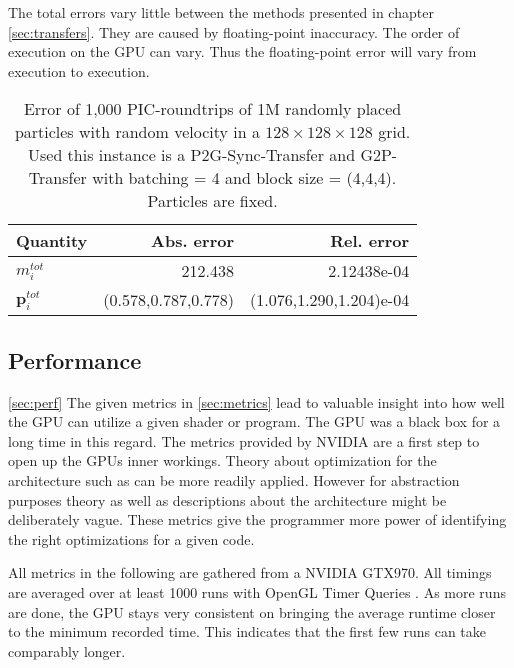 \documentclass[m,times]{cgMA}
\begin{document}
The total errors vary little between the methods presented in chapter \ref{sec:transfers}. They are caused by floating-point inaccuracy. The order of execution on the GPU can vary. Thus the floating-point error will vary from execution to execution.
\begin{table}[t]
\centering
  \begin{tabular}{|l|r|r|}\hline
    Quantity& Abs. error  & Rel. error \\ \hline
    $m^{tot}_i$ & 212.438     & 2.12438e-04     \\\hline
    $\boldsymbol{p}^{tot}_i$ & (0.578,0.787,0.778)&(1.076,1.290,1.204)e-04 \\\hline
   \end{tabular}
   \caption{Error of 1,000 PIC-roundtrips of 1M randomly placed particles with random velocity in a $128\times128\times128$ grid. Used this instance is a P2G-Sync-Transfer and G2P-Transfer with batching = 4 and block size = (4,4,4). Particles are fixed.}
  \label{tab:roundtrip}
\end{table}

\subsection{Performance}\ref{sec:perf}
The given metrics in \ref{sec:metrics} lead to valuable insight into how well the GPU can utilize a given shader or program. The GPU was a black box for a long time in this regard. The metrics provided by NVIDIA are a first step to open up the GPUs inner workings. Theory about optimization for the architecture such as \cite{NVIDIA:BEST:PRACTICE} can be more readily applied. However for abstraction purposes theory as well as descriptions about the architecture might be deliberately vague. These metrics give the programmer more power of identifying the right optimizations for a given code.

All metrics in the following are gathered from a NVIDIA GTX970. All timings are averaged over at least 1000 runs with OpenGL Timer Queries \cite{KHRONOS:TIMER_QUERY}. As more runs are done, the GPU stays very consistent on bringing the average runtime closer to the minimum recorded time. This indicates that the first few runs can take comparably longer.
\end{document}
